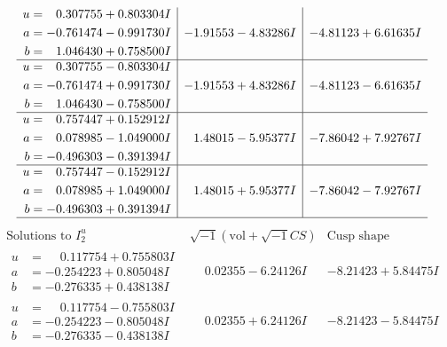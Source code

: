 \documentclass[1p]{elsarticle_modified}
\theoremstyle{definition}
\newcommand{\I}{\sqrt{-1}}
\begin{document}
$$\begin{array}{c|c|c}
\begin{aligned}
u &= \phantom{-}0.307755 + 0.803304 I \\
a &= -0.761474 - 0.991730 I \\
b &= \phantom{-}1.046430 + 0.758500 I\end{aligned}
 & -1.91553 - 4.83286 I & -4.81123 + 6.61635 I \\ \hline\begin{aligned}
u &= \phantom{-}0.307755 - 0.803304 I \\
a &= -0.761474 + 0.991730 I \\
b &= \phantom{-}1.046430 - 0.758500 I\end{aligned}
 & -1.91553 + 4.83286 I & -4.81123 - 6.61635 I \\ \hline\begin{aligned}
u &= \phantom{-}0.757447 + 0.152912 I \\
a &= \phantom{-}0.078985 - 1.049000 I \\
b &= -0.496303 - 0.391394 I\end{aligned}
 & \phantom{-}1.48015 - 5.95377 I & -7.86042 + 7.92767 I \\ \hline\begin{aligned}
u &= \phantom{-}0.757447 - 0.152912 I \\
a &= \phantom{-}0.078985 + 1.049000 I \\
b &= -0.496303 + 0.391394 I\end{aligned}
 & \phantom{-}1.48015 + 5.95377 I & -7.86042 - 7.92767 I\\
 \hline 
 \end{array}$$\newpage$$\begin{array}{c|c|c}  
\text{Solutions to }I^u_{2}& \I (\text{vol} + \sqrt{-1}CS) & \text{Cusp shape}\\
 \hline 
\begin{aligned}
u &= \phantom{-}0.117754 + 0.755803 I \\
a &= -0.254223 + 0.805048 I \\
b &= -0.276335 + 0.438138 I\end{aligned}
 & \phantom{-}0.02355 - 6.24126 I & -8.21423 + 5.84475 I \\ \hline\begin{aligned}
u &= \phantom{-}0.117754 - 0.755803 I \\
a &= -0.254223 - 0.805048 I \\
b &= -0.276335 - 0.438138 I\end{aligned}
 & \phantom{-}0.02355 + 6.24126 I & -8.21423 - 5.84475 I \\ \hline\begin{aligned}

\end{aligned}
\end{array}$$
\end{document}
